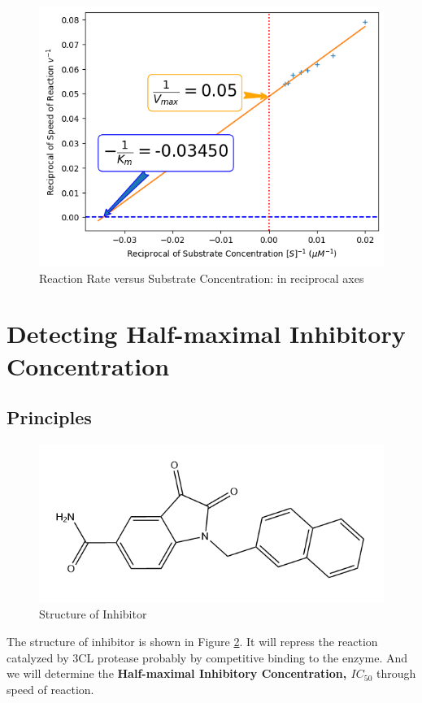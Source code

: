 \documentclass{report}
\begin{document}
\begin{figure}
    \centering
    \includegraphics[width=1\linewidth]{../Figures/substrate3.png}
    \caption{Reaction Rate versus Substrate Concentration: in reciprocal axes}
    \label{Reaction Rate versus Substrate Concentration: in reciprocall axes}
\end{figure}


\section{Detecting Half-maximal Inhibitory Concentration}

\subsection{Principles}
\begin{figure}
    \centering
    \includegraphics[width=0.7\linewidth]{../Figures/inhibitor structure.png}
    \caption{Structure of Inhibitor}
    \label{Structure of Inhibitor}
\end{figure}
The structure of inhibitor is shown in Figure \ref{Structure of Inhibitor}.
It will repress the reaction catalyzed by 3CL protease probably by competitive binding to the enzyme.
And we will determine the \textbf{Half-maximal Inhibitory Concentration, $IC_{50}$} through speed of reaction.
\end{document}
